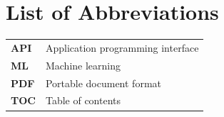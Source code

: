 \chapter*{List of Abbreviations}

{
\renewcommand{\arraystretch}{1.6}
\begin{longtable}{p{3.2cm} p{11.5cm}}
\textbf{API} & Application programming interface \\
\textbf{ML} & Machine learning \\
\textbf{PDF} & Portable document format \\
\textbf{TOC} & Table of contents \\
\end{longtable}
}

\cleardoublepage
